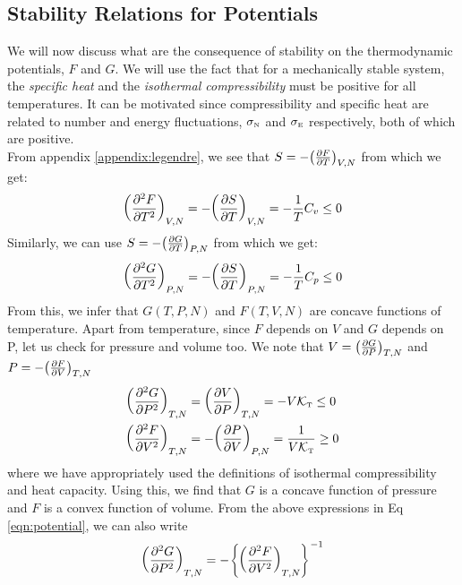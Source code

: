 \subsection{Stability Relations for Potentials}
We will now discuss what are the consequence of stability on the thermodynamic potentials, $F$ and $G$. We will use the fact that for a mechanically stable system, the \textit{specific heat} and the \textit{isothermal compressibility} must be positive for all temperatures. It can be motivated since compressibility and specific heat are related to number and energy fluctuations, $\sigma_{\text{\tiny N}}$ and $\sigma_{\text{\tiny E}}$ respectively, both of which are positive.\\[0.2cm]
From appendix \ref{appendix:legendre}, we see that $S = -\qty(\pdv{F}{T})_{V,N}$ from which we get:
$$\qty(\pdv[2]{F}{T})_{V,N} = - \qty(\pdv{S}{T})_{V,N} = -\frac{1}{T}C_v \leq 0$$
Similarly, we can use $S = -\qty(\pdv{G}{T})_{P,N}$ from which we get:
$$\qty(\pdv[2]{G}{T})_{P,N} = - \qty(\pdv{S}{T})_{P,N} = -\frac{1}{T}C_p \leq 0$$
From this, we infer that $G(T,P,N)$ and $F(T,V,N)$ are concave functions of temperature. Apart from temperature, since $F$ depends on $V$ and $G$ depends on P, let us check for pressure and volume too. We note that $V = \qty(\pdv{G}{P})_{T,N}$ and $P = -\qty(\pdv{F}{V})_{T,N}$
\begin{align}\label{eqn:potential}
    \begin{split}
        \qty(\pdv[2]{G}{P})_{T,N} &=  \qty(\pdv{V}{P})_{T,N} = -V\mathcal K_{\text{\tiny T}} \leq 0\\
    \qty(\pdv[2]{F}{V})_{T,N} &= - \qty(\pdv{P}{V})_{P,N} = \frac{1}{V\mathcal K_{\text{\tiny T}}} \geq 0
    \end{split}
\end{align}
where we have appropriately used the definitions of isothermal compressibility and heat capacity. Using this, we find that $G$ is a concave function of pressure and $F$ is a convex function of volume. From the above expressions in Eq \ref{eqn:potential}, we can also write 
\begin{equation}\label{eqn:inverseGA}
    \qty(\pdv[2]{G}{P})_{T,N} = -\qty{\qty(\pdv[2]{F}{V})_{T,N}}^{-1} 
\end{equation}
